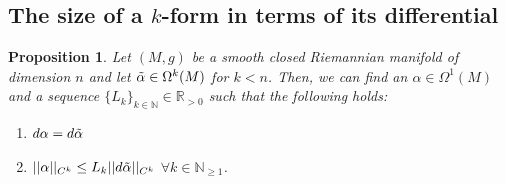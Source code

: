 \documentclass[11pt]{amsart}
\theoremstyle{plain}
\newtheorem{proposition}[theorem]{Proposition}
\theoremstyle{definition}
\theoremstyle{remark}
\begin{document}
\subsection{The size of a $k$-form in terms of its differential}
\begin{proposition}\label{elliptic_bounds_on_1_forms}
Let $(M,g)$ be a smooth closed Riemannian manifold of dimension $n$ and let $\Tilde{\alpha} \in \Omega^k(M)$ for $k < n$. Then, we can find an $\alpha \in \Omega^1(M)$ and a sequence $\{L_{k}\}_{k \in \mathbb{N}} \in \mathbb{R}_{>0}$ such that the following holds:
\begin{enumerate}
    \item $d\alpha = d\Tilde{\alpha}$
    \item $||\alpha||_{C^k} \leq L_k ||d\Tilde{\alpha}||_{C^k}$ $\forall k \in \mathbb{N}_{\geq 1}$. 
\end{enumerate}
\end{proposition}
\end{document}
